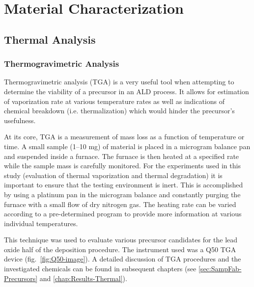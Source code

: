 \chapter{Material Characterization}
\label{chap:Charact}
\thispagestyle{empty}


\section{Thermal Analysis}
\label{sec:Charact-Thermal}


\subsection{Thermogravimetric Analysis}

Thermogravimetric analysis (TGA) is a very useful tool when attempting to determine the viability of a precursor in an ALD process. It allows for estimation of vaporization rate at various temperature rates as well as indications of chemical breakdown (i.e. thermalization) which would hinder the precursor's usefulness. 

At its core, TGA is a measurement of mass loss as a function of temperature or time. A small sample (1--10 mg) of material is placed in a microgram balance pan and suspended inside a furnace. The furnace is then heated at a specified rate while the sample mass is carefully monitored. For the experiments used in this study (evaluation of thermal vaporization and thermal degradation) it is important to ensure that the testing environment is inert. This is accomplished by using a platinum pan in the microgram balance and constantly purging the furnace with a small flow of dry nitrogen gas. The heating rate can be varied according to a pre-determined program to provide more information at various individual temperatures.\cite{Broido_TGA_1969,Doyle_TGA_1961,horowitz_TGA_1963,wunderlich_thermal_1990} 

This technique was used to evaluate various precursor candidates for the lead oxide half of the \PTO{} deposition procedure. The instrument used was a Q50 TGA device (fig.~\vref{fig:Q50-image}).  A detailed discussion of TGA procedures and the investigated chemicals can be found in subsequent chapters (see \vref{sec:SampFab-Precursors} and \vref{chap:Results-Thermal}). 

